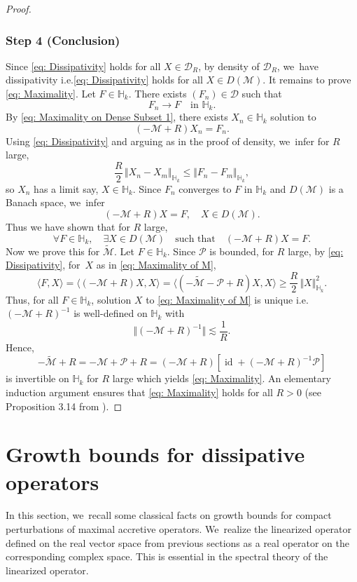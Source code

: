 \documentclass[10pt]{article}
\newcommand{\ie}{i.e.}
\theoremstyle{plain}
\theoremstyle{definition}
\DeclareMathOperator{\id}{id}
\begin{document}
\begin{proof}
\subsubsection*{Step 4 (Conclusion)}
Since \eqref{eq: Dissipativity} holds for all $X\in \mathcal D_R$, by density of $\mathcal D_R$, we~have dissipativity \ie \eqref{eq: Dissipativity} holds for all $X\in D(\mathcal M)$. It remains to prove \eqref{eq: Maximality}. Let $F\in \mathbb H_k$. There exists $(F_n)\in \mathcal D$ such that
\[
F_n\to F\quad\text{in }\mathbb H_k.
\]
By \eqref{eq: Maximality on Dense Subset 1}, there exists $X_n\in\mathbb H_k$ solution to
\[
(-\mathcal M+R)X_n=F_n.
\]
Using \eqref{eq: Dissipativity} and arguing as in the proof of density, we~infer for $R$ large,
\[
\frac{R}{2}\,\Vert X_n-X_m\Vert_{\mathbb H_k}\le \Vert F_n-F_m\Vert_{\mathbb H_k},
\]
so $X_n$ has a limit say, $X\in \mathbb H_k$. Since $F_n$ converges to $F$ in $\mathbb H_k$ and $D(\mathcal M)$ is a Banach space, we~infer
\[
(-\mathcal M+R)X=F,\quad X\in D(\mathcal M).
\]
Thus we have shown that for $R$ large,
\begin{equation}
\label{eq: Maximality of M}
\forall F\in \mathbb H_k,\quad \exists X\in D(\mathcal M)\quad \text{such that}\quad (-\mathcal M+R)X=F.
\end{equation}
Now we prove this for $\tilde{\mathcal M}$. Let $F\in\mathbb H_k$. Since $\mathcal P$ is bounded, for $R$ large, by \eqref{eq: Dissipativity}, for~$X$ as in \eqref{eq: Maximality of M},
\[
\langle F,X\rangle =\langle(-\mathcal M+R)X,X\rangle = \langle(-\tilde{\mathcal M}-\mathcal P+R)X,X\rangle \ge \frac{R}{2}\,\Vert X\Vert_{\mathbb H_k}^2.
\]
Thus, for all $F\in \mathbb H_k$, solution $X$ to \eqref{eq: Maximality of M} is unique \ie $(-\mathcal M+R)^{-1}$ is well-defined on $\mathbb H_k$ with
\[
\Vert (-\mathcal M+R)^{-1}\Vert\lesssim \frac{1}{R}.
\]
Hence,
\[
-\tilde{\mathcal M}+R=-\mathcal M+\mathcal P+R=(-\mathcal M+R)[\id+(-\mathcal M+R)^{-1}\mathcal P]
\]
is invertible on $\mathbb H_k$ for $R$ large which yields \eqref{eq: Maximality}. An elementary induction argument ensures that \eqref{eq: Maximality} holds for all $R>0$ (see Proposition 3.14 from \cite{EN}).
\end{proof}

\section{Growth bounds for dissipative operators}
\label{sec: 6}

In this section, we~recall some classical facts on growth bounds for compact perturbations of maximal accretive operators. We~realize the linearized operator defined on the real vector space from previous sections as a real operator on the corresponding complex space. This is essential in the spectral theory of the linearized operator.
\end{document}
